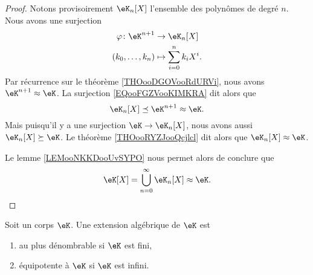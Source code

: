 \begin{proof}
	Notons provisoirement \( \eK_n[X]\) l'ensemble des polynômes de degré \( n\). Nous avons une surjection
	\begin{equation}    \label{EQooFGZVooKIMKRA}
		\begin{aligned}
			\varphi\colon \eK^{n+1} & \to \eK_n[X]                \\
			(k_0,\ldots, k_n)       & \mapsto \sum_{i=0}^nk_iX^i.
		\end{aligned}
	\end{equation}
	Par récurrence sur le théorème \ref{THOooDGOVooRdURVi}, nous avons \( \eK^{n+1}\approx \eK\). La surjection \eqref{EQooFGZVooKIMKRA} dit alors que
	\begin{equation}
		\eK_n[X]\preceq \eK^{n+1}\approx \eK.
	\end{equation}
	Mais puisqu'il y a une surjection \( \eK\to \eK_n[X]\), nous avons aussi \( \eK_n[X]\succeq \eK\). Le théorème \ref{THOooRYZJooQcjlcl} dit alors que \( \eK_n[X]\approx \eK\).

	Le lemme \ref{LEMooNKKDooUvSYPO} nous permet alors de conclure que
	\begin{equation}
		\eK[X]=\bigcup_{n=0}^{\infty}\eK_n[X]\approx \eK.
	\end{equation}
\end{proof}

\begin{proposition}      \label{PROPooVPQFooScWvkS}
	Soit un corps \( \eK\). Une extension algébrique de \( \eK\) est
	\begin{enumerate}
		\item
		      au plus dénombrable si \( \eK\) est fini,
		\item
		      équipotente à \( \eK\) si \( \eK\) est infini.
	\end{enumerate}
\end{proposition}

